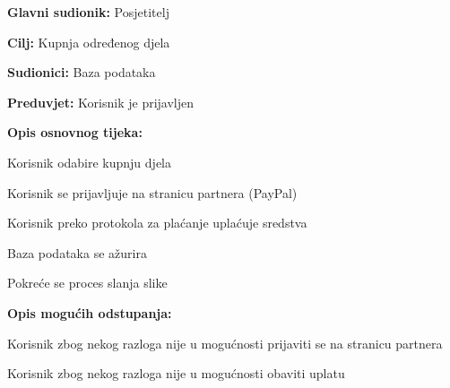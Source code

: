					\noindent {}
					\begin{packed_item}
						
						\item \textbf{Glavni sudionik: }Posjetitelj
						\item  \textbf{Cilj:} Kupnja određenog djela
						\item  \textbf{Sudionici:} Baza podataka
						\item  \textbf{Preduvjet:} Korisnik je prijavljen
						\item  \textbf{Opis osnovnog tijeka:}
						
						\item[] \begin{packed_enum}
							
							\item Korisnik odabire kupnju djela						
							\item Korisnik se prijavljuje na stranicu partnera (PayPal)							
							\item Korisnik preko protokola za plaćanje uplaćuje sredstva
							\item Baza podataka se ažurira
							\item Pokreće se proces slanja slike 

						\end{packed_enum}
						
						\item \textbf{Opis mogućih odstupanja:} 					
							\item[] \begin{packed_enum}
							\item Korisnik zbog nekog razloga nije u mogućnosti prijaviti se na stranicu partnera
							\item Korisnik zbog nekog razloga nije u mogućnosti obaviti uplatu
						\end{packed_enum}


	
					\end{packed_item}
					
